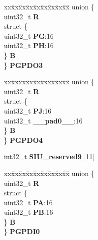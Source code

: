 \begin{DoxyCompactItemize}
\begin{tabbing}
\end{tabbing}\item 
\mbox{\label{structSIU__tag_a4527a6810326e8e70f99aa29691bd332}} 
\begin{tabbing}
xx\=xx\=xx\=xx\=xx\=xx\=xx\=xx\=xx\=\kill
union \{\\
\>uint32\_t {\bfseries R}\\
\>struct \{\\
\>\>uint32\_t {\bfseries PG}:16\\
\>\>uint32\_t {\bfseries PH}:16\\
\>\} {\bfseries B}\\
\} {\bfseries PGPDO3}\\

\end{tabbing}\item 
\mbox{\label{structSIU__tag_a2db915511f262cea899328d4c0ca188b}} 
\begin{tabbing}
xx\=xx\=xx\=xx\=xx\=xx\=xx\=xx\=xx\=\kill
union \{\\
\>uint32\_t {\bfseries R}\\
\>struct \{\\
\>\>uint32\_t {\bfseries PJ}:16\\
\>\>uint32\_t {\bfseries \_\_pad0\_\_}:16\\
\>\} {\bfseries B}\\
\} {\bfseries PGPDO4}\\

\end{tabbing}\item 
\mbox{\label{structSIU__tag_a9fa121df67c5105487f0dfa558b2d680}} 
int32\+\_\+t {\bfseries S\+I\+U\+\_\+reserved9} \mbox{[}11\mbox{]}
\item 
\mbox{\label{structSIU__tag_ae0620377e153f8b5dd95c7b0b2fdbb2e}} 
\begin{tabbing}
xx\=xx\=xx\=xx\=xx\=xx\=xx\=xx\=xx\=\kill
union \{\\
\>uint32\_t {\bfseries R}\\
\>struct \{\\
\>\>uint32\_t {\bfseries PA}:16\\
\>\>uint32\_t {\bfseries PB}:16\\
\>\} {\bfseries B}\\
\} {\bfseries PGPDI0}\\


\end{tabbing}
\end{DoxyCompactItemize}
